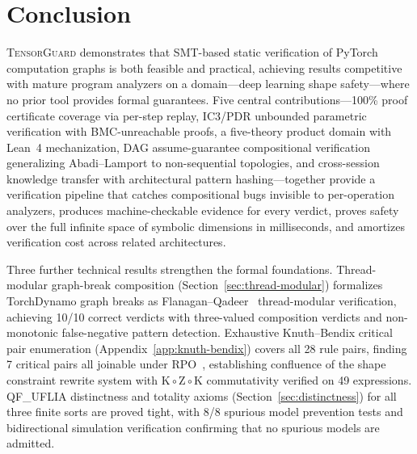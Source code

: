 \documentclass[11pt]{article}
\begin{document}
\section{Conclusion}\label{sec:conclusion}

\textsc{TensorGuard} demonstrates that SMT-based static verification
of PyTorch computation graphs is both feasible and practical,
achieving results competitive with mature program analyzers on a
domain---deep learning shape safety---where no prior tool provides
formal guarantees.  Five central contributions---100\% proof
certificate coverage via per-step replay, IC3/PDR unbounded
parametric verification with BMC-unreachable proofs, a
five-theory product domain with Lean~4 mechanization,
DAG assume-guarantee compositional verification generalizing
Abadi--Lamport to non-sequential topologies, and cross-session
knowledge transfer with architectural pattern hashing---together
provide a verification pipeline that catches compositional bugs
invisible to per-operation analyzers, produces machine-checkable
evidence for every verdict, proves safety over the full infinite
space of symbolic dimensions in milliseconds, and amortizes
verification cost across related architectures.

Three further technical results strengthen the formal foundations.
Thread-modular graph-break composition (Section~\ref{sec:thread-modular})
formalizes TorchDynamo graph breaks as Flanagan--Qadeer~\cite{flanagan03}
thread-modular verification, achieving 10/10 correct verdicts with
three-valued composition verdicts and non-monotonic false-negative
pattern detection.
Exhaustive Knuth--Bendix critical pair enumeration
(Appendix~\ref{app:knuth-bendix}) covers all 28 rule pairs,
finding 7 critical pairs all joinable under RPO~\cite{dershowitz82},
establishing confluence of the shape constraint rewrite system with
$\mathrm{K} \circ \mathrm{Z} \circ \mathrm{K}$ commutativity verified
on 49 expressions.
QF\_UFLIA distinctness and totality axioms (Section~\ref{sec:distinctness})
for all three finite sorts are proved tight, with 8/8 spurious model
prevention tests and bidirectional simulation verification confirming
that no spurious models are admitted.
\end{document}
